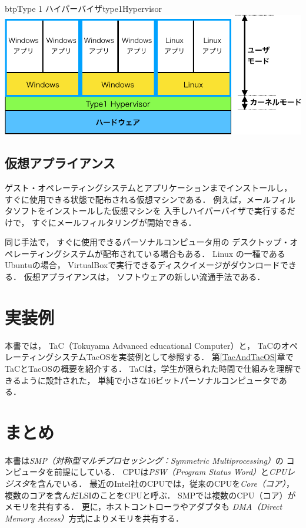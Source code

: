 \begin{myfig}{btp}{Type 1 ハイパーバイザ}{type1Hypervisor}
  \includegraphics[scale=0.66]{Fig/type1Hypervisor-crop.pdf}
\end{myfig}

\subsection{仮想アプライアンス}
ゲスト・オペレーティングシステムとアプリケーションまでインストールし，
すぐに使用できる状態で配布される仮想マシンである．
例えば，メールフィルタソフトをインストールした仮想マシンを
入手しハイパーバイザで実行するだけで，
すぐにメールフィルタリングが開始できる．

同じ手法で，
すぐに使用できるパーソナルコンピュータ用の
デスクトップ・オペレーティングシステムが配布されている場合もある．
Linux の一種であるUbuntuの場合，
VirtualBoxで実行できるディスクイメージがダウンロードできる\cite{ubuntu}．
仮想アプライアンスは，
ソフトウェアの新しい流通手法である．

\section{実装例}
本書では，
TaC（Tokuyama Advanced educational Computer）と，
TaCのオペレーティングシステムTacOSを実装例として参照する．
第\ref{TacAndTacOS}章でTaCとTacOSの概要を紹介する．
TaCは，学生が限られた時間で仕組みを理解できるように設計された，
単純で小さな16ビットパーソナルコンピュータである．

\section{まとめ}
本書は\emph{SMP（対称型マルチプロセッシング：Symmetric Multiprocessing）}の
コンピュータを前提にしている．
CPUは\emph{PSW（Program Status Word）}と\emph{CPUレジスタ}を含んでいる．
最近のIntel社のCPUでは，従来のCPUを\emph{Core（コア）}，
複数のコアを含んだLSIのことをCPUと呼ぶ．
SMPでは複数のCPU（コア）がメモリを共有する．
更に，ホストコントローラやアダプタも
\emph{DMA（Direct Memory Access）}方式によりメモリを共有する．

